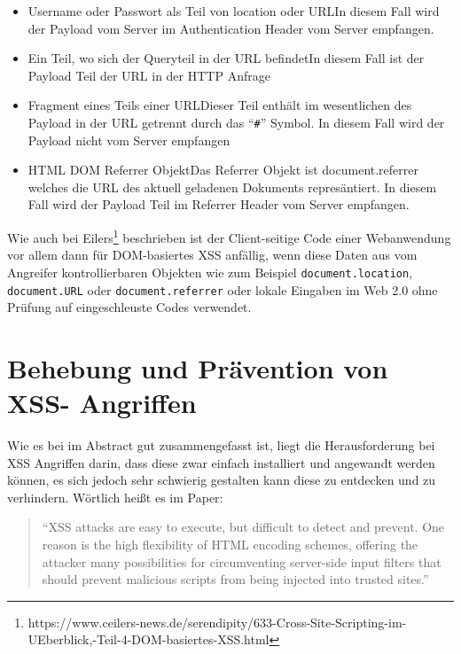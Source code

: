 \begin{itemize}
	\item Username oder Passwort als Teil von location oder URL\newline In diesem Fall wird der Payload vom Server im Authentication Header vom Server empfangen.
	\item Ein Teil, wo sich der Queryteil in der URL befindet\newline In diesem Fall ist der Payload Teil der URL in der HTTP Anfrage
	\item Fragment eines Teils einer URL\newline Dieser Teil enthält im wesentlichen des Payload in der URL getrennt durch das ``\verb+#+'' Symbol. In diesem Fall wird der Payload nicht vom Server empfangen
	\item HTML DOM Referrer Objekt\newline Das Referrer Objekt ist document.referrer welches die URL des aktuell geladenen Dokuments represäntiert. In diesem Fall wird der Payload Teil im Referrer Header vom Server empfangen.
\end{itemize}

Wie auch bei Eilers\footnote{https://www.ceilers-news.de/serendipity/633-Cross-Site-Scripting-im-UEberblick,-Teil-4-DOM-basiertes-XSS.html} beschrieben ist der Client-seitige Code einer Webanwendung vor allem dann für DOM-basiertes XSS anfällig, wenn diese Daten aus vom Angreifer kontrollierbaren Objekten wie zum Beispiel \verb+document.location+, \verb+document.URL+ oder \verb+document.referrer+ oder lokale Eingaben im Web 2.0 ohne Prüfung auf eingeschleuste Codes verwendet.


\section{Behebung und Prävention von XSS- Angriffen}
\label{section:prevention_of_xss_attacks}

Wie es bei \textcite{kirda2009} im Abstract gut zusammengefasst ist, liegt die Herausforderung bei XSS Angriffen darin, dass diese zwar einfach installiert und angewandt werden können, es sich jedoch sehr schwierig gestalten kann diese zu entdecken und zu verhindern. Wörtlich heißt es im Paper:

\begin{quote}
``XSS attacks are easy to execute, but difficult to detect and prevent. One reason is the high flexibility of HTML encoding schemes, offering the attacker many possibilities for circumventing server-side input filters that should prevent malicious scripts from being injected into trusted sites.''

\autocite[592]{kirda2009}
\end{quote}

